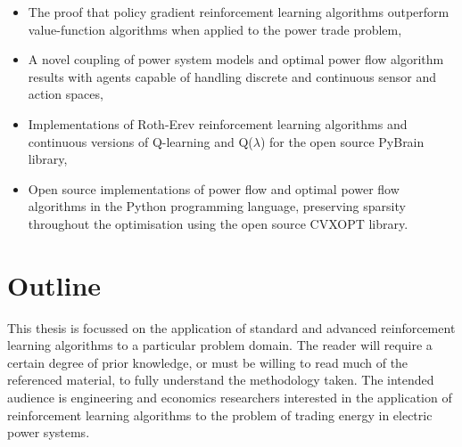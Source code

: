 \begin{itemize}
  \item The proof that policy gradient reinforcement learning algorithms
  outperform value-function algorithms when applied to the power trade problem,
  \item A novel coupling of power system models and optimal power flow
  algorithm results with agents capable of handling discrete and continuous
  sensor and action spaces,
  \item Implementations of Roth-Erev reinforcement learning algorithms and
  continuous versions of Q-learning and Q($\lambda$) for the open source
  PyBrain library,
  \item Open source implementations of power flow and optimal power flow
  algorithms in the Python programming language, preserving sparsity throughout
  the optimisation using the open source CVXOPT library.
\end{itemize}


\section{Outline}%
This thesis is focussed on the application of standard and advanced
reinforcement learning algorithms to a particular problem domain.  The reader
will require a certain degree of prior knowledge, or must be willing to read
much of the referenced material, to fully understand the methodology taken.
The intended audience is engineering and economics researchers interested in
the application of reinforcement learning algorithms to the problem of trading
energy in electric power systems.


